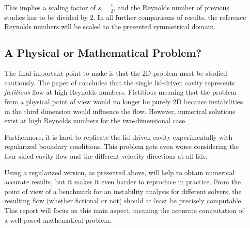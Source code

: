 This implies a scaling factor of $s=\frac{1}{2}$, and the Reynolds number of
previous studies has to be divided by $2$. In all further comparisons of
results, the reference Reynolds numbers will be scaled to the presented
symmetrical domain.

\subsection{A Physical or Mathematical Problem?}

The final important point to make is that the 2D problem must be studied
cautiously. The paper of \cite{eturk2009} concludes that the single lid-driven
cavity represents \emph{fictitious} flow at high Reynolds numbers. Fictitious
meaning that the problem from a physical point of view would no longer be
purely 2D because instabilities in the third dimension would influence the
flow. However, numerical solutions exist at high Reynolds numbers for the
two-dimensional case.

Furthermore, it is hard to replicate the lid-driven cavity experimentally with
regularized boundary conditions. This problem gets even worse considering the
four-sided cavity flow and the different velocity directions at all lids.

Using a regularized version, as presented above, will help to obtain numerical
accurate results, but it makes it even harder to reproduce in practice. From
the point of view of a benchmark for an instability analysis for different
solvers, the resulting flow (whether fictional or not) should at least be
precisely computable. This report will focus on this main aspect, meaning the
accurate computation of a well-posed mathematical problem. 
